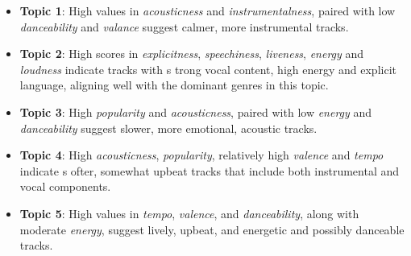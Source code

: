 \begin{itemize}
  \item \textbf{Topic 1}: High values in \textit{acousticness} and
    \textit{instrumentalness}, paired with low \textit{danceability} and
    \textit{valance} suggest calmer, more instrumental tracks.
  \item \textbf{Topic 2}: High scores in \textit{explicitness},
    \textit{speechiness}, \textit{liveness}, \textit{energy} and
    \textit{loudness} indicate tracks with s trong vocal content, high energy
    and explicit language, aligning well with the dominant genres in this
    topic.
  \item \textbf{Topic 3}: High \textit{popularity} and \textit{acousticness},
    paired with low \textit{energy} and  \textit{danceability} suggest slower,
    more emotional, acoustic tracks.
  \item \textbf{Topic 4}: High \textit{acousticness},  \textit{popularity},
    relatively high \textit{valence} and \textit{tempo} indicate s ofter,
    somewhat upbeat  tracks that include both instrumental and vocal
    components.
  \item \textbf{Topic 5}: High values in \textit{tempo}, \textit{valence}, and
    \textit{danceability}, along with moderate \textit{energy}, suggest lively,
    upbeat, and energetic and possibly danceable tracks.
\end{itemize}
